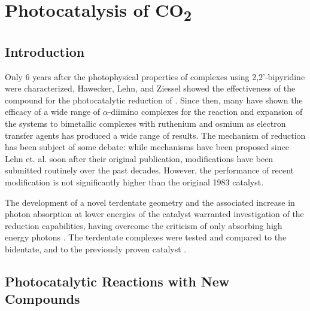 \chapter{Photocatalysis of \texorpdfstring{CO\textsubscript{2}}{CO2}}\label{chap.co2}

\section{Introduction}

Only 6 years after the photophysical properties of  complexes using 2,2'-bipyridine were characterized\autocite{morse1976}, Hawecker, Lehn, and Ziessel showed the effectiveness of the compound for the photocatalytic reduction of \autocite{hawecker1983}. Since then, many have shown the efficacy of a wide range of $\alpha$-diimino complexes for the reaction\autocite{hawecker1986, kurz2006, portenkirchner2014} and expansion of the systems to bimetallic complexes with ruthenium and osmium as electron transfer agents has produced a wide range of results\autocite{rossenaar1996, takeda2008, tamaki2013}. The mechanism of reduction has been subject of some debate: while mechanisms have been proposed since Lehn et. al. soon after their original publication\autocite{hawecker1986}, modifications have been submitted routinely over the past decades\autocite{hayashi2003, morris2009, takeda2008, grills2010, agarwal2011, agarwal2012a, agarwal2012b, keith2013}. However, the performance of recent modification is not significantly higher than the original 1983 catalyst.

The development of a novel terdentate geometry and the associated increase in photon absorption at lower energies of the catalyst warranted investigation of the  reduction capabilities, having overcome the criticism of only absorbing high energy photons \autocite{kutal1985}. The terdentate complexes were tested and compared to the bidentate, and to the previously proven catalyst . 

\section{Photocatalytic Reactions with New Compounds}

